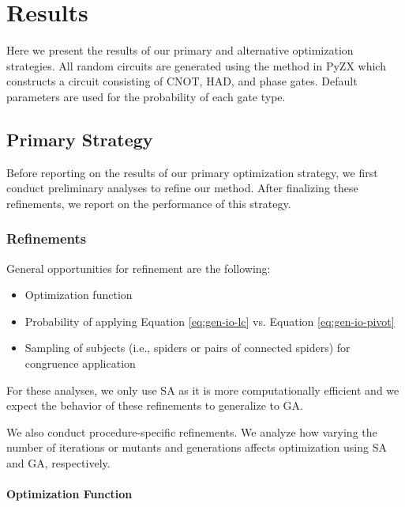 \chapter[Results]{Results} \label{ch:results}

Here we present the results of our primary and alternative optimization strategies.
All random circuits are generated using the  method in PyZX which constructs a circuit consisting of CNOT, HAD, and phase gates.
Default parameters are used for the probability of each gate type.

\section{Primary Strategy}

Before reporting on the results of our primary optimization strategy, we first conduct preliminary analyses to refine our method.
After finalizing these refinements, we report on the performance of this strategy.

\subsection{Refinements}

General opportunities for refinement are the following:
\begin{itemize}
\item
  Optimization function
\item
  Probability of applying Equation \ref{eq:gen-io-lc} vs. Equation \ref{eq:gen-io-pivot}
\item
  Sampling of subjects (i.e., spiders or pairs of connected spiders) for congruence application
\end{itemize}
For these analyses, we only use SA as it is more computationally efficient and we expect the behavior of these refinements to generalize to GA.

We also conduct procedure-specific refinements.
We analyze how varying the number of iterations or mutants and generations affects optimization using SA and GA, respectively.

\subsubsection*{Optimization Function}

